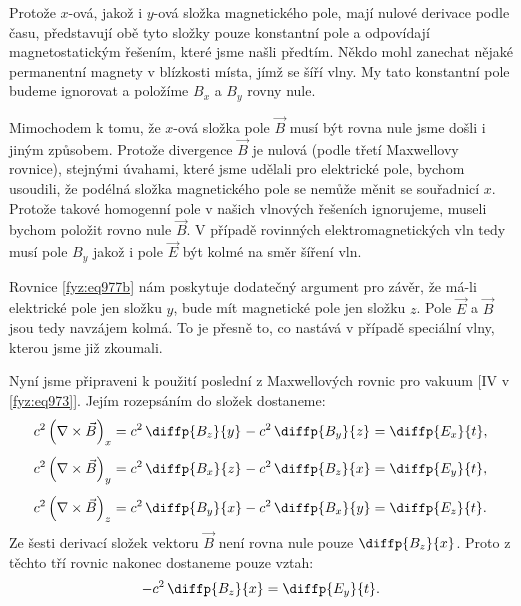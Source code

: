     Protože \(x\)-ová, jakož i \(y\)-ová složka magnetického pole, mají nulové derivace podle času,
    představují obě tyto složky pouze konstantní pole a odpovídají magnetostatickým řešením, které
    jsme našli předtím. Někdo mohl zanechat nějaké permanentní magnety v blízkosti místa, jímž se
    šíří vlny. My tato konstantní pole budeme ignorovat a položíme \(B_x\) a \(B_y\) rovny nule.
    
    Mimochodem k tomu, že \(x\)-ová složka pole \(\vec{B}\) musí být rovna nule jsme došli i jiným
    způsobem. Protože divergence \(\vec{B}\) je nulová (podle třetí Maxwellovy rovnice), stejnými
    úvahami, které jsme udělali pro elektrické pole, bychom usoudili, že podélná složka magnetického
    pole se nemůže měnit se souřadnicí \(x\). Protože takové homogenní pole v našich vlnových
    řešeních ignorujeme, museli bychom položit rovno nule \(\vec{B}\). V případě rovinných
    elektromagnetických vln tedy musí pole \(B_y\) jakož i pole \(\vec{E}\) být kolmé na směr šíření
    vln.
    
    Rovnice \eqref{fyz:eq977b} nám poskytuje dodatečný argument pro závěr, že má-li elektrické pole
    jen složku \(y\), bude mít magnetické pole jen složku \(z\). Pole \(\vec{E}\) a \(\vec{B}\) jsou
    tedy navzájem kolmá. To je přesně to, co nastává v případě speciální vlny, kterou jsme již
    zkoumali.
    
    Nyní jsme připraveni k použití poslední z Maxwellových rovnic pro vakuum [IV v
    \eqref{fyz:eq973}]. Jejím rozepsáním do složek dostaneme:
    \begin{equation}\label{fyz:eq978}
      \begin{alignedat}{4}
        &c^2\left(\nabla\times\vec{B}\right)_x&&=
          c^2\,\diffp{B_z}{y}&&-c^2\,\diffp{B_y}{z}&&=\diffp{E_x}{t},\\[1ex]
        &c^2\left(\nabla\times\vec{B}\right)_y&&=
          c^2\,\diffp{B_x}{z}&&-c^2\,\diffp{B_z}{x}&&=\diffp{E_y}{t},\\[1ex]
        &c^2\left(\nabla\times\vec{B}\right)_z&&=
          c^2\,\diffp{B_y}{x}&&-c^2\,\diffp{B_x}{y}&&=\diffp{E_z}{t}.
      \end{alignedat}
    \end{equation}
    Ze šesti derivací složek vektoru \(\vec{B}\) není rovna nule pouze \(\diffp{B_z}{x}\). Proto z
    těchto tří rovnic nakonec dostaneme pouze vztah:
    \begin{equation}\label{fyz:eq979}
      -c^2\,\diffp{B_z}{x}=\diffp{E_y}{t}.
    \end{equation}


